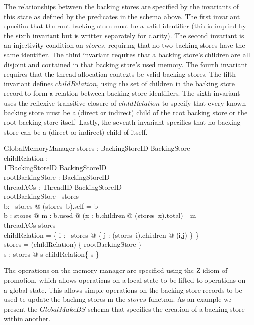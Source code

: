 \documentclass[a4paper,10pt]{report}
\begin{document}
The relationships between the backing stores are specified by the invariants of
this state as defined by the predicates in the schema above. The first invariant
specifies that the root backing store must be a valid identifier (this is
implied by the sixth invariant but is written separately for clarity). The
second invariant is an injectivity condition on $stores$, requiring that no two
backing stores have the same identifier. The third invariant requires that a
backing store's children are all disjoint and contained in that backing store's 
used memory. The fourth invariant requires that
the thread allocation contexts be valid backing stores. The fifth invariant 
defines $childRelation$, using the set of children in the backing store record
to form a relation between backing store identifiers. The sixth invariant uses
the reflexive transitive closure of $childRelation$ to specify that every known
backing store must be a (direct or indirect) child of the root backing store or
the root backing store itself. Lastly, the seventh invariant specifies that no
backing store can be a (direct or indirect) child of itself.
%
\begin{schema}{GlobalMemoryManager}
  stores : BackingStoreID \pfun BackingStore \\
  childRelation : \\
    \t1 BackingStoreID \rel BackingStoreID \\
  rootBackingStore : BackingStoreID \\
  threadACs : ThreadID \pfun BackingStoreID \\
\where
  rootBackingStore \in \dom~stores \\
  \forall b: \dom~stores @ (stores~b).self = b \\
  \forall b : \ran stores @ \exists m : \power b.used @ 
    (\lambda x : b.children @ (stores~x).total)~\partition~m \\
  \ran threadACs \subseteq \dom stores \\
  childRelation = \bigcup \{ i : \dom~stores @ \{ j : (stores~i).children @ (i,j) \} \} \\
  \dom stores = (childRelation\star) \limg \{ rootBackingStore \} \rimg \\
  \forall s : \dom stores @ s \notin childRelation\plus \limg \{ s \} \rimg \\
\end{schema}
%
The operations on the memory manager are specified using the Z idiom of
promotion, which allows operations on a local state to be lifted to operations on
a global state.  This allows simple operations on the backing store records to be
used to update the backing stores in the $stores$ function.  As an
example we present the $GlobalMakeBS$ schema that specifies the creation of a
backing store within another.
\end{document}
